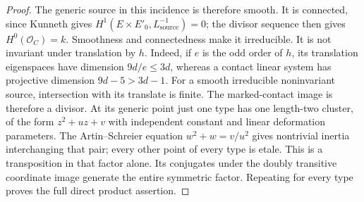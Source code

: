 \begin{proof}
The generic source in this incidence is therefore smooth.
It is connected, since Kunneth gives
$H^1(E\times E'_0,L_{\mathrm{source}}^{-1})=0$; the divisor
sequence then gives $H^0(\mathcal O_C)=k$. Smoothness and
connectedness make it irreducible. It is not invariant under
translation by $h$.
Indeed, if $e$ is the odd order of $h$, its translation
eigenspaces have dimension $9d/e\leq3d$, whereas a contact
linear system has projective dimension $9d-5>3d-1$.
For a smooth irreducible noninvariant source, intersection with
its translate is finite. The marked-contact image is therefore
a divisor. At its generic point just one type has one length-two
cluster, of the form $z^2+uz+v$ with independent constant and
linear deformation parameters. The Artin--Schreier equation
$w^2+w=v/u^2$ gives nontrivial inertia interchanging that pair;
every other point of every type is etale. This is a transposition
in that factor alone. Its conjugates under the doubly transitive
coordinate image generate the entire symmetric factor. Repeating
for every type proves the full direct product assertion.
\end{proof}

